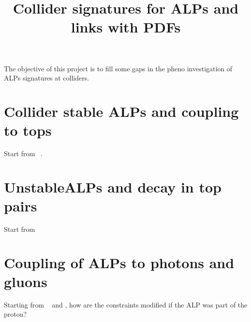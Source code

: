 \documentclass[11pt,a4paper]{article}
\title{Collider signatures for ALPs and links with PDFs}
\begin{document}
\maketitle

The objective of this project is to fill some gaps in the pheno investigation of ALPs signatures at colliders.

\section{Collider stable ALPs and coupling to tops}

Start from ~\cite{Brivio:2017ije}.

\section{UnstableALPs and decay in top pairs}
Start from ~\cite{Bonilla:2021ufe}

\section{Coupling of ALPs to photons and gluons}
Starting from ~\cite{Mimasu:2014nea} and \cite{Gavela:2019cmq}, how
are the constraints modified if the ALP was part of the proton?



\end{document}

